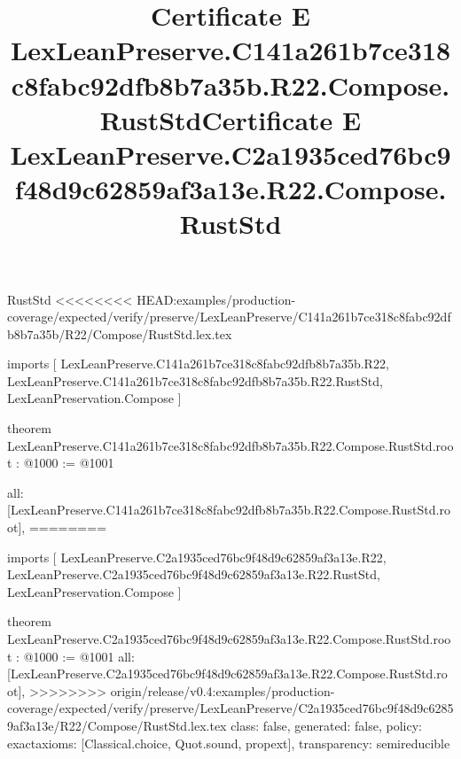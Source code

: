 \begin{lexlean}{RustStd}
<<<<<<<< HEAD:examples/production-coverage/expected/verify/preserve/LexLeanPreserve/C141a261b7ce318c8fabc92dfb8b7a35b/R22/Compose/RustStd.lex.tex
\title{Certificate E LexLeanPreserve.C141a261b7ce318c8fabc92dfb8b7a35b.R22.Compose.RustStd}
\begin{coremodule}
imports [
  LexLeanPreserve.C141a261b7ce318c8fabc92dfb8b7a35b.R22,
  LexLeanPreserve.C141a261b7ce318c8fabc92dfb8b7a35b.R22.RustStd,
  LexLeanPreservation.Compose
]

theorem LexLeanPreserve.C141a261b7ce318c8fabc92dfb8b7a35b.R22.Compose.RustStd.root : @1000 := @1001 {
  all: [LexLeanPreserve.C141a261b7ce318c8fabc92dfb8b7a35b.R22.Compose.RustStd.root],
========
\title{Certificate E LexLeanPreserve.C2a1935ced76bc9f48d9c62859af3a13e.R22.Compose.RustStd}
\begin{coremodule}
imports [
  LexLeanPreserve.C2a1935ced76bc9f48d9c62859af3a13e.R22,
  LexLeanPreserve.C2a1935ced76bc9f48d9c62859af3a13e.R22.RustStd,
  LexLeanPreservation.Compose
]

theorem LexLeanPreserve.C2a1935ced76bc9f48d9c62859af3a13e.R22.Compose.RustStd.root : @1000 := @1001 {
  all: [LexLeanPreserve.C2a1935ced76bc9f48d9c62859af3a13e.R22.Compose.RustStd.root],
>>>>>>>> origin/release/v0.4:examples/production-coverage/expected/verify/preserve/LexLeanPreserve/C2a1935ced76bc9f48d9c62859af3a13e/R22/Compose/RustStd.lex.tex
  class: false,
  generated: false,
  policy: exact{axioms: [Classical.choice, Quot.sound, propext]},
  transparency: semireducible
}


\end{coremodule}}
\end{coremodule}
\end{lexlean}
